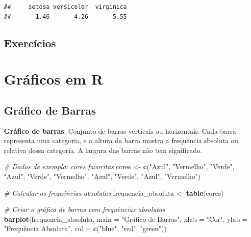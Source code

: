 \documentclass[
]{book}
\newenvironment{Shaded}{\begin{snugshade}}{\end{snugshade}}
\newcommand{\AttributeTok}[1]{\textcolor[rgb]{0.13,0.29,0.53}{#1}}
\newcommand{\CommentTok}[1]{\textcolor[rgb]{0.56,0.35,0.01}{\textit{#1}}}
\newcommand{\FunctionTok}[1]{\textcolor[rgb]{0.13,0.29,0.53}{\textbf{#1}}}
\newcommand{\NormalTok}[1]{#1}
\newcommand{\OtherTok}[1]{\textcolor[rgb]{0.56,0.35,0.01}{#1}}
\newcommand{\StringTok}[1]{\textcolor[rgb]{0.31,0.60,0.02}{#1}}
\begin{document}
\begin{verbatim}
##     setosa versicolor  virginica 
##       1.46       4.26       5.55
\end{verbatim}

\section{Exercícios}\label{exercuxedcios-9}

\chapter{Gráficos em R}\label{gruxe1ficos-em-r}

\section{Gráfico de Barras}\label{gruxe1fico-de-barras}

\textbf{Gráfico de barras}: Conjunto de barras verticais ou horizontais. Cada barra representa uma categoria, e a altura da barra mostra a frequência sbsoluta ou relativa dessa categoria. A largura das barras não tem significado.

\begin{Shaded}
\begin{Highlighting}[]
\CommentTok{\# Dados de exemplo: cores favoritas}
\NormalTok{cores }\OtherTok{\textless{}{-}} \FunctionTok{c}\NormalTok{(}\StringTok{"Azul"}\NormalTok{, }\StringTok{"Vermelho"}\NormalTok{, }\StringTok{"Verde"}\NormalTok{, }\StringTok{"Azul"}\NormalTok{, }\StringTok{"Verde"}\NormalTok{, }
\StringTok{"Vermelho"}\NormalTok{, }\StringTok{"Azul"}\NormalTok{, }\StringTok{"Verde"}\NormalTok{, }\StringTok{"Azul"}\NormalTok{, }\StringTok{"Vermelho"}\NormalTok{)}

\CommentTok{\# Calcular as frequências absolutas}
\NormalTok{frequencia\_absoluta }\OtherTok{\textless{}{-}} \FunctionTok{table}\NormalTok{(cores)}

\CommentTok{\# Criar o gráfico de barras com frequências absolutas}
\FunctionTok{barplot}\NormalTok{(frequencia\_absoluta,}
  \AttributeTok{main =} \StringTok{"Gráfico de Barras"}\NormalTok{,         }
  \AttributeTok{xlab =} \StringTok{"Cor"}\NormalTok{,         }
  \AttributeTok{ylab =} \StringTok{"Frequência Absoluta"}\NormalTok{,         }
  \AttributeTok{col =} \FunctionTok{c}\NormalTok{(}\StringTok{"blue"}\NormalTok{, }\StringTok{"red"}\NormalTok{, }\StringTok{"green"}\NormalTok{)) }
\end{Highlighting}
\end{Shaded}
\end{document}
